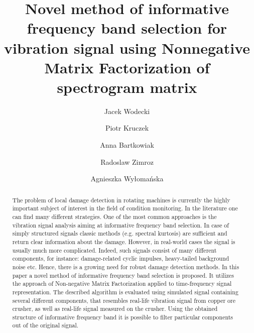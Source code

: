 \documentclass[preprint,12pt]{elsarticle}
\begin{document}
\begin{frontmatter}

\title{Novel method of informative frequency band selection for vibration signal using Nonnegative Matrix Factorization of spectrogram matrix}


\author[label3]{Jacek Wodecki }
\author[label1]{Piotr Kruczek}
\author[label2]{Anna Bartkowiak}
\author[label3]{Radoslaw Zimroz}
\author[label4]{Agnieszka Wy{\l}oma{\'n}ska}

\address[label1]{KGHM Cuprum Ltd, Research and Development Centre, Sikorskiego 2-8, 53-659 Wroclaw, Poland}
\address[label2]{Institute of Computer Science, Wroc{\l}aw University, 50-383 Wroc{\l}aw, Poland, retired}
\address[label3]{Diagnostics and Vibro-Acoustic Science Laboratory, Faculty of Geoengineering, Mining and Geology, Wroclaw University of Science and Technology, Na Grobli 15, 50-421 Wroclaw}
\address[label4]{Faculty of Pure and Applied Mathematics, Hugo Steinhaus Centre, Wroc{\l}aw University of Science and Technology, Janiszewskiego 14a 50-370 Wroc{\l}aw, Poland}



\begin{abstract}
The problem of local damage detection in rotating machines is currently the highly important subject of interest in the field of condition monitoring. In the literature one can find many different strategies. One of the most common approaches is the vibration signal analysis aiming at informative frequency band selection. In case of simply structured signals classic methods (e.g. spectral kurtosis) are sufficient and return clear information about the damage. However, in real-world cases the signal is usually much more complicated. Indeed, such signals consist of many different components, for instance: damage-related cyclic impulses, heavy-tailed background noise etc. Hence, there is a growing need for robust damage detection methods. In this paper a novel method of informative frequency band selection is proposed. It utilizes the approach of Non-negative Matrix Factorization applied to time-frequency signal representation. The described algorithm is evaluated using simulated signal containing several different components, that resembles real-life vibration signal from copper ore crusher, as well as real-life signal measured on the crusher. Using the obtained structure of informative frequency band it is possible to filter particular components out of the original signal.
\end{abstract}


\end{frontmatter}
\end{document}
